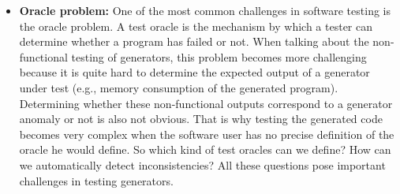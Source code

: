 \begin{itemize}
\item
\textbf{Oracle problem:} One of the most common challenges in software testing is the oracle problem. A test oracle is the mechanism by which a tester can determine whether a program has failed or not.
When talking about the non-functional testing of generators, this problem becomes more challenging because it is quite hard to determine the expected output of a generator under test (e.g., memory consumption of the generated program). Determining whether these non-functional outputs correspond to a generator anomaly or not is also not obvious. That is why testing the generated code becomes very complex when the software user has no precise definition of the oracle he would define. So which kind of test oracles can we define? How can we automatically detect inconsistencies? All these questions pose important challenges in testing generators.


\end{itemize}
